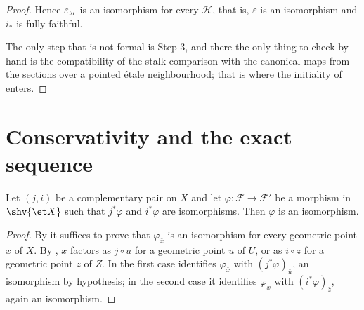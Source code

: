 \begin{proof}
Hence $\varepsilon_{\mathcal H}$ is an isomorphism for every $\mathcal H$,
that is, $\varepsilon$ is an isomorphism and $i_*$ is fully faithful.

The only step that is not formal is Step 3, and there the only thing to check
by hand is the compatibility of the stalk comparison with the canonical maps
from the sections over a pointed \'etale neighbourhood; that is where the
initiality of  enters.
\end{proof}

\section{Conservativity and the exact sequence}\label{sec:openclosed-exact}

\begin{proposition}
\label{prop:openclosed-conservative}
\leanok
Let $(j,i)$ be a complementary pair on $X$ and let
$\varphi\colon\mathcal F\to\mathcal F'$ be a morphism in $\shv{\et X}$ such
that $j^*\varphi$ and $i^*\varphi$ are isomorphisms.  Then $\varphi$ is an
isomorphism.
\end{proposition}
\begin{proof}
\leanok
By  it suffices to prove that
$\varphi_{\bar x}$ is an isomorphism for every geometric point $\bar x$ of
$X$.  By , $\bar x$ factors as
$j\circ\bar u$ for a geometric point $\bar u$ of $U$, or as $i\circ\bar z$
for a geometric point $\bar z$ of $Z$.  In the first case
 identifies $\varphi_{\bar x}$ with
$(j^*\varphi)_{\bar u}$, an isomorphism by hypothesis; in the second case it
identifies $\varphi_{\bar x}$ with $(i^*\varphi)_{\bar z}$, again an
isomorphism.
\end{proof}

